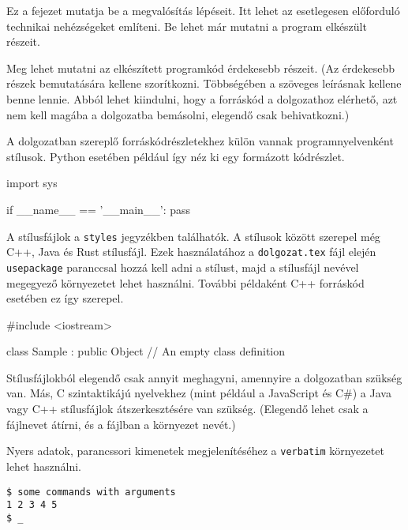 
Ez a fejezet mutatja be a megvalósítás lépéseit.
Itt lehet az esetlegesen előforduló technikai nehézségeket említeni.
Be lehet már mutatni a program elkészült részeit.

Meg lehet mutatni az elkészített programkód érdekesebb részeit.
(Az érdekesebb részek bemutatására kellene szorítkozni.
Többségében a szöveges leírásnak kellene benne lennie.
Abból lehet kiindulni, hogy a forráskód a dolgozathoz elérhető, azt nem kell magába a dolgozatba bemásolni, elegendő csak behivatkozni.)

A dolgozatban szereplő forráskódrészletekhez külön vannak programnyelvenként stílusok.
Python esetében például így néz ki egy formázott kódrészlet.
\begin{python}
import sys

if __name__ == '__main__':
    pass
\end{python}

A stílusfájlok a \texttt{styles} jegyzékben találhatók.
A stílusok között szerepel még C++, Java és Rust stílusfájl.
Ezek használatához a \texttt{dolgozat.tex} fájl elején \texttt{usepackage} paranccsal hozzá kell adni a stílust, majd a stílusfájl nevével megegyező környezetet lehet használni.
További példaként C++ forráskód esetében ez így szerepel.
\begin{cpp}
#include <iostream>

class Sample : public Object
{
    // An empty class definition
}
\end{cpp}
Stílusfájlokból elegendő csak annyit meghagyni, amennyire a dolgozatban szükség van.
Más, C szintaktikájú nyelvekhez (mint például a JavaScript és C\#) a Java vagy C++ stílusfájlok átszerkesztésére van szükség.
(Elegendő lehet csak a fájlnevet átírni, és a fájlban a környezet nevét.)

Nyers adatok, parancssori kimenetek megjelenítéséhez a \texttt{verbatim} környezetet lehet használni.
\begin{verbatim}
$ some commands with arguments
1 2 3 4 5
$ _
\end{verbatim}

